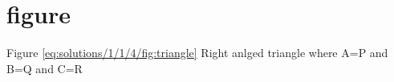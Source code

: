 \section{figure}

Figure \ref{eq:solutions/1/1/4/fig:triangle} Right anlged triangle where A=P and B=Q and C=R


